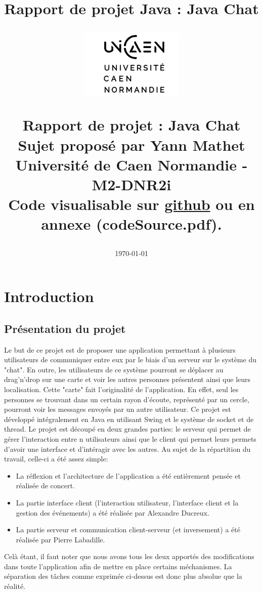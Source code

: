 \documentclass[a4paper,12pt]{report}
\title{Rapport de projet Java : Java Chat}
\title{%
  \begin{figure}[!ht]%
    \centering
    \includegraphics[width=5cm]{unicaen.jpg}%
  \end{figure}%
  Rapport de projet : Java Chat \\
  \large Sujet proposé par Yann Mathet \\
  \large Université de Caen Normandie - M2-DNR2i \\
    Code visualisable sur \href{https://github.com/alimux/JavaChat}{github} ou en annexe (codeSource.pdf).
}
\author{\authorName}
\date{\today}
\begin{document}
  \maketitle
  \tableofcontents

  \chapter{Introduction}

    \section{Présentation du projet}
    Le but de ce projet est de proposer une application permettant à plusieurs utilisateurs de communiquer entre eux par le biais d'un serveur sur le système du "chat". En outre, les utilisateurs de ce système pourront se déplacer au drag'n'drop sur une carte et voir les autres personnes présentent ainsi que leurs localisation. Cette "carte" fait l'originalité de l'application. En effet, seul les personnes se trouvant dans un certain rayon d'écoute, représenté par un cercle, pourront voir les messages envoyés par un autre utilisateur. 
    \medbreak
    Ce projet est développé intégralement en Java en utilisant Swing et le système de socket et de thread. Le projet est découpé en deux grandes parties: le serveur qui permet de gérer l'interaction entre n utilisateurs ainsi que le client qui permet leurs permets d'avoir une interface et d'intéragir avec les autres.
    \bigbreak
    Au sujet de la répartition du travail, celle-ci a été assez simple:
    \begin{itemize}
      \item La réflexion et l'architecture de l'application a été entièrement pensée et réalisée de concert.
      \item La partie interface client (l'interaction utilisateur, l'interface client et la gestion des événements) a été réalisée par Alexandre Ducreux.
      \item La partie serveur et communication client-serveur (et inversement) a été réalisée par Pierre Labadille.
    \end{itemize}
    \medbreak
    Celà étant, il faut noter que nous avons tous les deux apportés des modifications dans toute l'application afin de mettre en place certains méchanismes. La séparation des tâches comme exprimée ci-dessus est donc plus absolue que la réalité. 
\end{document}
